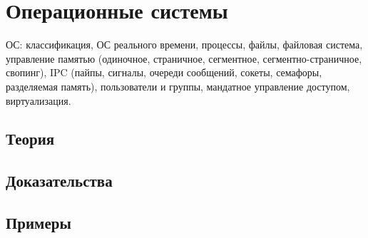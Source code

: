 
\section{Операционные системы}
\label{sec:2.3b.06-operating-systems}

\begin{ticket}
ОС: классификация, ОС реального времени, процессы, файлы, файловая система, управление памятью (одиночное, страничное, сегментное, сегментно-страничное, свопинг), IPC (пайпы, сигналы, очереди сообщений, сокеты, семафоры, разделяемая память), пользователи и группы, мандатное управление доступом, виртуализация.
\end{ticket}

\subsection*{Теория}

\subsection*{Доказательства}

\subsection*{Примеры}

